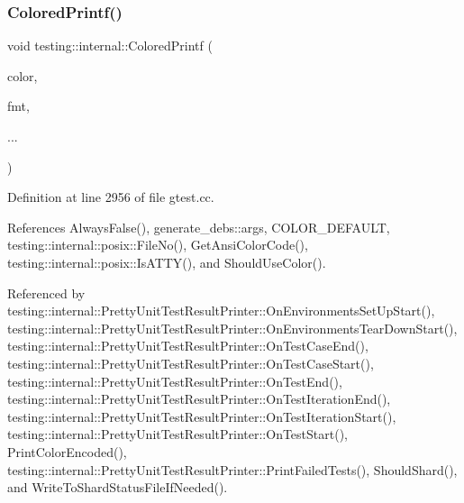 \subsubsection{\texorpdfstring{Colored\+Printf()}{ColoredPrintf()}}
{\footnotesize\ttfamily void testing\+::internal\+::\+Colored\+Printf (\begin{DoxyParamCaption}\item[{\hyperlink{namespacetesting_1_1internal_a648c1bc94c2ef9e868ff3f9dff0f9c4e}{G\+Test\+Color}}]{color,  }\item[{const char $\ast$}]{fmt,  }\item[{}]{... }\end{DoxyParamCaption})}



Definition at line 2956 of file gtest.\+cc.



References Always\+False(), generate\+\_\+debs\+::args, C\+O\+L\+O\+R\+\_\+\+D\+E\+F\+A\+U\+LT, testing\+::internal\+::posix\+::\+File\+No(), Get\+Ansi\+Color\+Code(), testing\+::internal\+::posix\+::\+Is\+A\+T\+T\+Y(), and Should\+Use\+Color().



Referenced by testing\+::internal\+::\+Pretty\+Unit\+Test\+Result\+Printer\+::\+On\+Environments\+Set\+Up\+Start(), testing\+::internal\+::\+Pretty\+Unit\+Test\+Result\+Printer\+::\+On\+Environments\+Tear\+Down\+Start(), testing\+::internal\+::\+Pretty\+Unit\+Test\+Result\+Printer\+::\+On\+Test\+Case\+End(), testing\+::internal\+::\+Pretty\+Unit\+Test\+Result\+Printer\+::\+On\+Test\+Case\+Start(), testing\+::internal\+::\+Pretty\+Unit\+Test\+Result\+Printer\+::\+On\+Test\+End(), testing\+::internal\+::\+Pretty\+Unit\+Test\+Result\+Printer\+::\+On\+Test\+Iteration\+End(), testing\+::internal\+::\+Pretty\+Unit\+Test\+Result\+Printer\+::\+On\+Test\+Iteration\+Start(), testing\+::internal\+::\+Pretty\+Unit\+Test\+Result\+Printer\+::\+On\+Test\+Start(), Print\+Color\+Encoded(), testing\+::internal\+::\+Pretty\+Unit\+Test\+Result\+Printer\+::\+Print\+Failed\+Tests(), Should\+Shard(), and Write\+To\+Shard\+Status\+File\+If\+Needed().


